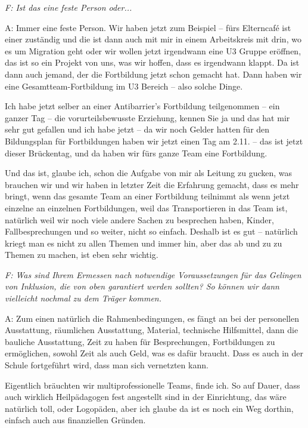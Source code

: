 \begin{linenumbers*}
\emph{F: Ist das eine feste Person oder...}

A: Immer eine feste Person. Wir haben jetzt zum Beispiel -- fürs Elterncafé ist einer zuständig und die ist dann auch mit mir in einem Arbeitskreis mit drin, wo es um Migration geht 
oder wir wollen jetzt irgendwann eine U3 Gruppe eröffnen, das ist so ein Projekt von uns, was wir hoffen, dass es irgendwann klappt. Da ist dann auch jemand, der die Fortbildung jetzt schon gemacht hat. Dann haben wir eine Gesamtteam-Fortbildung im U3 Bereich -- also solche Dinge. 

Ich habe jetzt selber an einer Antibarrier's Fortbildung teilgenommen -- ein ganzer Tag -- die vorurteilsbewusste Erziehung, kennen Sie ja und das hat mir sehr gut gefallen und ich habe jetzt -- da wir noch Gelder hatten für den Bildungsplan für Fortbildungen haben wir jetzt einen Tag am 2.11. – das ist jetzt dieser Brückentag, und da haben wir fürs ganze Team eine Fortbildung. 

Und das ist, glaube ich, schon die Aufgabe von mir als Leitung zu gucken, was brauchen wir und wir haben in letzter Zeit die Erfahrung gemacht, dass es mehr bringt, wenn das gesamte Team an einer Fortbildung teilnimmt als wenn jetzt einzelne an einzelnen Fortbildungen, weil das Transportieren in das Team ist, natürlich weil wir noch viele andere Sachen zu besprechen haben, Kinder, Fallbesprechungen und so weiter, nicht so einfach. Deshalb ist es gut -- natürlich kriegt man es nicht zu allen Themen und immer hin, aber das ab und zu zu Themen zu machen, ist eben sehr wichtig. 

\emph{F: Was sind Ihrem Ermessen nach notwendige Voraussetzungen für das Gelingen von Inklusion, die von oben garantiert werden sollten? So können wir dann vielleicht nochmal zu dem Träger kommen.}

A: Zum einen natürlich die Rahmenbedingungen, es fängt an bei der personellen Ausstattung, räumlichen Ausstattung, Material, technische Hilfsmittel, dann die bauliche Ausstattung, Zeit zu haben für Besprechungen, Fortbildungen zu ermöglichen, sowohl Zeit als auch Geld, was es dafür braucht. Dass es auch in der Schule fortgeführt wird, dass man sich vernetzten kann. 

Eigentlich bräuchten wir multiprofessionelle Teams, finde ich. So auf Dauer, dass auch wirklich Heilpädagogen fest angestellt sind in der Einrichtung, das wäre natürlich toll, oder Logopäden, aber ich glaube da ist es noch ein Weg dorthin, einfach auch aus finanziellen Gründen. 


\end{linenumbers*}
